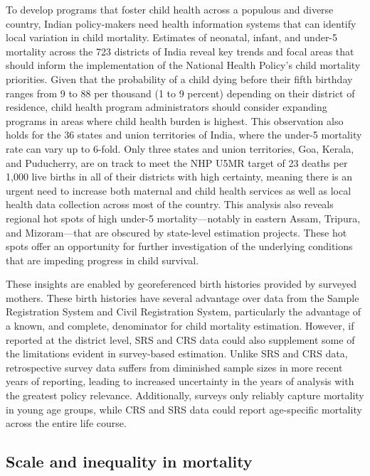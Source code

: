 \documentclass[
]{report}
\begin{document}
To develop programs that foster child health across a populous and diverse country, Indian policy-makers need health information systems that can identify local variation in child mortality. Estimates of neonatal, infant, and under-5 mortality across the 723 districts of India reveal key trends and focal areas that should inform the implementation of the National Health Policy's child mortality priorities. Given that the probability of a child dying before their fifth birthday ranges from 9 to 88 per thousand (1 to 9 percent) depending on their district of residence, child health program administrators should consider expanding programs in areas where child health burden is highest. This observation also holds for the 36 states and union territories of India, where the under-5 mortality rate can vary up to 6-fold. Only three states and union territories, Goa, Kerala, and Puducherry, are on track to meet the NHP U5MR target of 23 deaths per 1,000 live births in all of their districts with high certainty, meaning there is an urgent need to increase both maternal and child health services as well as local health data collection across most of the country. This analysis also reveals regional hot spots of high under-5 mortality---notably in eastern Assam, Tripura, and Mizoram---that are obscured by state-level estimation projects. These hot spots offer an opportunity for further investigation of the underlying conditions that are impeding progress in child survival.

These insights are enabled by georeferenced birth histories provided by surveyed mothers. These birth histories have several advantage over data from the Sample Registration System and Civil Registration System, particularly the advantage of a known, and complete, denominator for child mortality estimation. However, if reported at the district level, SRS and CRS data could also supplement some of the limitations evident in survey-based estimation. Unlike SRS and CRS data, retrospective survey data suffers from diminished sample sizes in more recent years of reporting, leading to increased uncertainty in the years of analysis with the greatest policy relevance. Additionally, surveys only reliably capture mortality in young age groups, while CRS and SRS data could report age-specific mortality across the entire life course.

\hypertarget{scale-and-inequality-in-mortality}{%
\subsection{Scale and inequality in mortality}\label{scale-and-inequality-in-mortality}}
\end{document}
